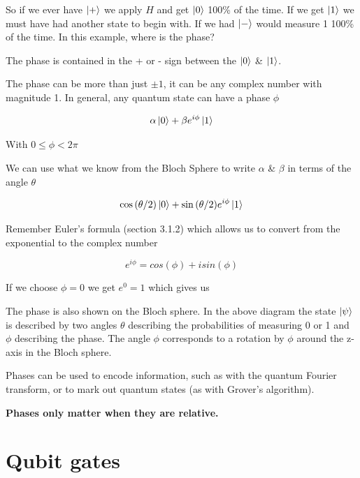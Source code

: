 So if we ever have $\ket{+}$ we apply $H$ and get $\ket{0}$ 100\% of the time. If we get $\ket{1}$ we must have had another state to begin with. If we had $\ket{-}$ would measure 1 100\% of the time. In this example, where is the phase? 

The phase is contained in the + or - sign between the $\ket{0}$ \& $\ket{1}$. 

The phase can be more than just $\pm 1$, it can be any complex number with magnitude 1. In general, any quantum state can have a phase $\phi$ 

$$ \alpha\ket{0} + \beta e^{i\phi}\ket{1} $$

With $ 0 \leq \phi < 2\pi $

We can use what we know from the Bloch Sphere to write $\alpha$ \& $\beta$ in terms of the angle $\theta$

$$ \cos{(\theta/2)}\ket{0} + \sin{(\theta/2)} e^{i\phi}\ket{1} $$

Remember Euler's formula (section 3.1.2) which allows us to convert from the exponential to the complex number

$$ e^{i \phi} = cos(\phi) + i sin(\phi) $$

If we choose $\phi = 0$ we get $e^0 = 1$ which gives us 

The phase is also shown on the Bloch sphere. In the above diagram the state $\ket{\psi}$ is described by two angles $\theta$ describing the probabilities of measuring 0 or 1 and $\phi$ describing the phase. The angle $\phi$ corresponds to a rotation by $\phi$ around the z-axis in the Bloch sphere.  

Phases can be used to encode information, such as with the quantum Fourier transform, or to mark out quantum states (as with Grover's algorithm). 

\textbf{Phases only matter when they are relative.}

 \section{Qubit gates }

